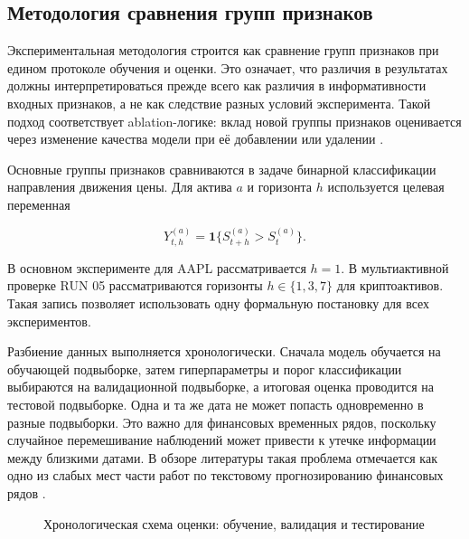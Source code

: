 \subsection{Методология сравнения групп признаков}

Экспериментальная методология строится как сравнение групп признаков при едином протоколе обучения и оценки. Это означает, что различия в результатах должны интерпретироваться прежде всего как различия в информативности входных признаков, а не как следствие разных условий эксперимента. Такой подход соответствует ablation-логике: вклад новой группы признаков оценивается через изменение качества модели при её добавлении или удалении \cite{guyon2003feature}.

Основные группы признаков сравниваются в задаче бинарной классификации направления движения цены. Для актива $a$ и горизонта $h$ используется целевая переменная

\[
Y_{t,h}^{(a)} = \mathbf{1}\{S_{t+h}^{(a)} > S_t^{(a)}\}.
\]

В основном эксперименте для AAPL рассматривается $h=1$. В мультиактивной проверке RUN 05 рассматриваются горизонты $h \in \{1,3,7\}$ для криптоактивов. Такая запись позволяет использовать одну формальную постановку для всех экспериментов.

Разбиение данных выполняется хронологически. Сначала модель обучается на обучающей подвыборке, затем гиперпараметры и порог классификации выбираются на валидационной подвыборке, а итоговая оценка проводится на тестовой подвыборке. Одна и та же дата не может попасть одновременно в разные подвыборки. Это важно для финансовых временных рядов, поскольку случайное перемешивание наблюдений может привести к утечке информации между близкими датами. В обзоре литературы такая проблема отмечается как одно из слабых мест части работ по текстовому прогнозированию финансовых рядов \cite{hiew2019bert,jiang2023finbert}.

\begin{figure}[htbp]
\centering
{}
\caption{Хронологическая схема оценки: обучение, валидация и тестирование}
\label{fig:chronological_evaluation_scheme}
\end{figure}

